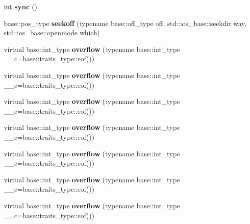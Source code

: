 \begin{DoxyCompactItemize}
\item 
\mbox{\label{structtestbuf_a8e1354905cc9378dad51a032e7b16a35}} 
int {\bfseries sync} ()
\item 
\mbox{\label{structtestbuf_a0bf3839a4f8c118fc41e0514a7f79a1e}} 
base\+::pos\+\_\+type {\bfseries seekoff} (typename base\+::off\+\_\+type off, std\+::ios\+\_\+base\+::seekdir way, std\+::ios\+\_\+base\+::openmode which)
\item 
\mbox{\label{structtestbuf_a1d33d01e5a3f18a1fa4407c67eb87f52}} 
virtual base\+::int\+\_\+type {\bfseries overflow} (typename base\+::int\+\_\+type \+\_\+\+\_\+c=base\+::traits\+\_\+type\+::eof())
\item 
\mbox{\label{structtestbuf_a1d33d01e5a3f18a1fa4407c67eb87f52}} 
virtual base\+::int\+\_\+type {\bfseries overflow} (typename base\+::int\+\_\+type \+\_\+\+\_\+c=base\+::traits\+\_\+type\+::eof())
\item 
\mbox{\label{structtestbuf_a1d33d01e5a3f18a1fa4407c67eb87f52}} 
virtual base\+::int\+\_\+type {\bfseries overflow} (typename base\+::int\+\_\+type \+\_\+\+\_\+c=base\+::traits\+\_\+type\+::eof())
\item 
\mbox{\label{structtestbuf_a1d33d01e5a3f18a1fa4407c67eb87f52}} 
virtual base\+::int\+\_\+type {\bfseries overflow} (typename base\+::int\+\_\+type \+\_\+\+\_\+c=base\+::traits\+\_\+type\+::eof())
\item 
\mbox{\label{structtestbuf_a1d33d01e5a3f18a1fa4407c67eb87f52}} 
virtual base\+::int\+\_\+type {\bfseries overflow} (typename base\+::int\+\_\+type \+\_\+\+\_\+c=base\+::traits\+\_\+type\+::eof())
\item 
\mbox{\label{structtestbuf_a1d33d01e5a3f18a1fa4407c67eb87f52}} 
virtual base\+::int\+\_\+type {\bfseries overflow} (typename base\+::int\+\_\+type \+\_\+\+\_\+c=base\+::traits\+\_\+type\+::eof())
\item 
\mbox{\label{structtestbuf_a1d33d01e5a3f18a1fa4407c67eb87f52}} 
virtual base\+::int\+\_\+type {\bfseries overflow} (typename base\+::int\+\_\+type \+\_\+\+\_\+c=base\+::traits\+\_\+type\+::eof())

\end{DoxyCompactItemize}
